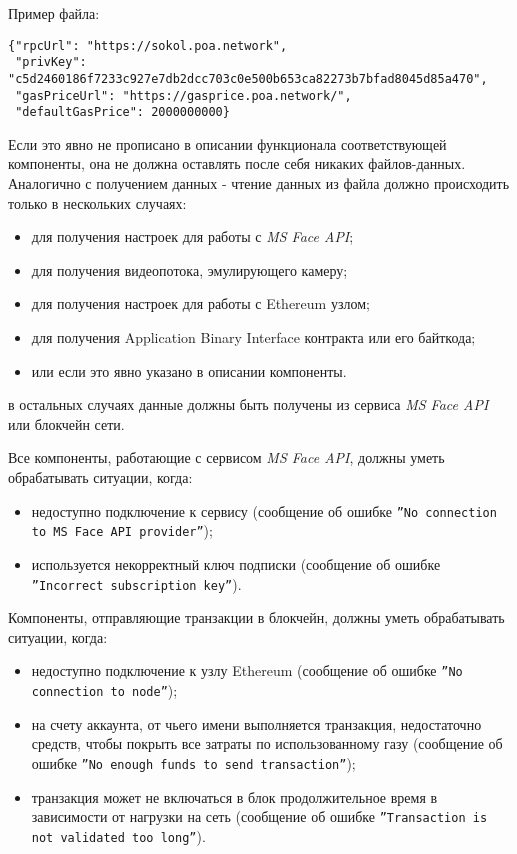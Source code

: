 Пример файла:
\begin{verbatim}
{"rpcUrl": "https://sokol.poa.network", 
 "privKey": "c5d2460186f7233c927e7db2dcc703c0e500b653ca82273b7bfad8045d85a470", 
 "gasPriceUrl": "https://gasprice.poa.network/", 
 "defaultGasPrice": 2000000000}
\end{verbatim}

Если это явно не прописано в описании функционала соответствующей компоненты,
она не должна оставлять после себя никаких файлов-данных. Аналогично с
получением данных - чтение данных из файла должно происходить только в
нескольких случаях:
\begin{itemize}
  \item для получения настроек для работы с \textit{MS Face API};
  
  \item для получения видеопотока, эмулирующего камеру;
  
  \item для получения настроек для работы с Ethereum узлом;
  
  \item для получения Application Binary Interface контракта или его байткода;
  
  \item или если это явно указано в описании компоненты.

\end{itemize}
в остальных случаях данные должны быть получены из сервиса
\textit{MS Face API} или блокчейн сети. 

Все компоненты, работающие с сервисом \textit{MS Face API},
должны уметь обрабатывать ситуации, когда:
\begin{itemize}
  \item недоступно подключение к сервису (сообщение об ошибке
  \texttt{''No connection to MS Face API provider''});

  \item используется некорректный ключ подписки (сообщение об
  ошибке \texttt{''Incorrect subscription key''}).

\end{itemize}

Компоненты, отправляющие транзакции в блокчейн, должны уметь обрабатывать
ситуации, когда:
\begin{itemize}
  \item недоступно подключение к узлу Ethereum (сообщение об ошибке
  \texttt{''No connection to node''});

  \item на счету аккаунта, от чьего имени выполняется транзакция,
  недостаточно средств, чтобы покрыть все затраты по использованному
  газу (сообщение об ошибке \texttt{''No enough funds to send transaction''});

  \item транзакция может не включаться в блок продолжительное время в
  зависимости от нагрузки на сеть (сообщение об ошибке
  \texttt{''Transaction is not validated too long''}).

\end{itemize}

